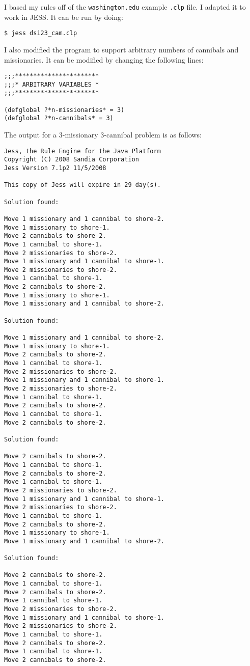 \documentclass{article}
\begin{document}
I based my rules off of the \texttt{washington.edu} example \texttt{.clp} file.
I adapted it to work in JESS. It can be run by doing:

\begin{verbatim}
$ jess dsi23_cam.clp
\end{verbatim}

I also modified the program to support arbitrary numbers of cannibals and
missionaries. It can be modified by changing the following lines:

\begin{verbatim}
;;;***********************
;;;* ARBITRARY VARIABLES *
;;;***********************

(defglobal ?*n-missionaries* = 3)
(defglobal ?*n-cannibals* = 3)
\end{verbatim}

The output for a 3-missionary 3-cannibal problem is as follows:

\begin{verbatim}
Jess, the Rule Engine for the Java Platform
Copyright (C) 2008 Sandia Corporation
Jess Version 7.1p2 11/5/2008

This copy of Jess will expire in 29 day(s).

Solution found:

Move 1 missionary and 1 cannibal to shore-2.
Move 1 missionary to shore-1.
Move 2 cannibals to shore-2.
Move 1 cannibal to shore-1.
Move 2 missionaries to shore-2.
Move 1 missionary and 1 cannibal to shore-1.
Move 2 missionaries to shore-2.
Move 1 cannibal to shore-1.
Move 2 cannibals to shore-2.
Move 1 missionary to shore-1.
Move 1 missionary and 1 cannibal to shore-2.

Solution found:

Move 1 missionary and 1 cannibal to shore-2.
Move 1 missionary to shore-1.
Move 2 cannibals to shore-2.
Move 1 cannibal to shore-1.
Move 2 missionaries to shore-2.
Move 1 missionary and 1 cannibal to shore-1.
Move 2 missionaries to shore-2.
Move 1 cannibal to shore-1.
Move 2 cannibals to shore-2.
Move 1 cannibal to shore-1.
Move 2 cannibals to shore-2.

Solution found:

Move 2 cannibals to shore-2.
Move 1 cannibal to shore-1.
Move 2 cannibals to shore-2.
Move 1 cannibal to shore-1.
Move 2 missionaries to shore-2.
Move 1 missionary and 1 cannibal to shore-1.
Move 2 missionaries to shore-2.
Move 1 cannibal to shore-1.
Move 2 cannibals to shore-2.
Move 1 missionary to shore-1.
Move 1 missionary and 1 cannibal to shore-2.

Solution found:

Move 2 cannibals to shore-2.
Move 1 cannibal to shore-1.
Move 2 cannibals to shore-2.
Move 1 cannibal to shore-1.
Move 2 missionaries to shore-2.
Move 1 missionary and 1 cannibal to shore-1.
Move 2 missionaries to shore-2.
Move 1 cannibal to shore-1.
Move 2 cannibals to shore-2.
Move 1 cannibal to shore-1.
Move 2 cannibals to shore-2.
\end{verbatim}
\end{document}
